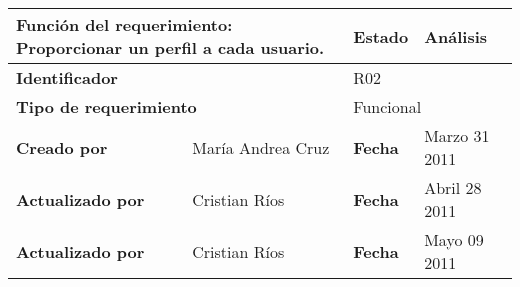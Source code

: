 %
\begin{center}
\begin{longtable}{|p{}|p{}|p{}|p{}|}
\hline
\multicolumn{2}{|p{0.45\textwidth}|}{{\bf {Función del requerimiento:}}
Proporcionar un perfil a cada usuario. } & {\bf{ Estado}} & Análisis \\
\hline
\multicolumn{2}{|p{0.45\textwidth}}{\bf Identificador} &
\multicolumn{2}{|p{0.45\textwidth}|}{R02} \\
\hline
\multicolumn{2}{|p{0.45\textwidth}}{\bf {Tipo de requerimiento}} &
\multicolumn{2}{|p{0.45\textwidth}|}{Funcional}\\
\hline
\bf {Creado por} & María Andrea Cruz & \bf {Fecha } & Marzo 31 2011 \\
\hline
\bf {Actualizado por} & Cristian Ríos & \bf {Fecha }& Abril 28 2011\\
\hline
\bf {Actualizado por} & Cristian Ríos & \bf {Fecha } & Mayo 09 2011\\



\end{longtable}
\end{center}
